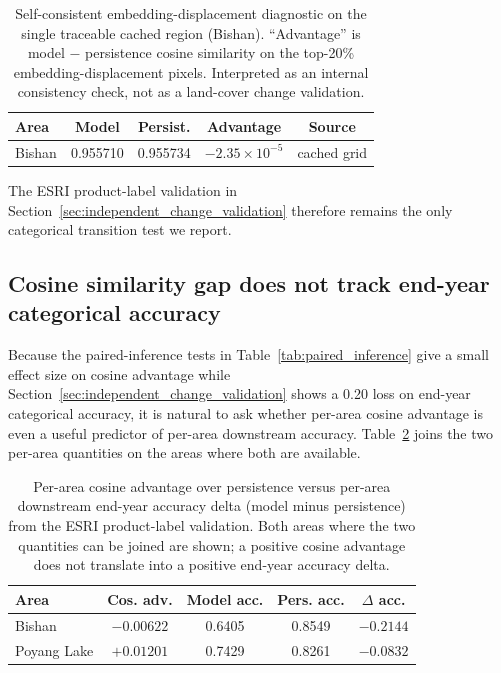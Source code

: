 \documentclass{article}
\begin{document}
\begin{table}[htbp]
\centering
\caption{Self-consistent embedding-displacement diagnostic on the single traceable cached region (Bishan). ``Advantage'' is model $-$ persistence cosine similarity on the top-20\% embedding-displacement pixels. Interpreted as an internal consistency check, not as a land-cover change validation.}
\label{tab:changepixel}
\begin{tabular}{lcccc}
\toprule
Area & Model & Persist. & Advantage & Source \\
\midrule
Bishan & 0.955710 & 0.955734 & $-2.35 \times 10^{-5}$ & cached grid \\
\bottomrule
\end{tabular}
\end{table}

The ESRI product-label validation in Section~\ref{sec:independent_change_validation} therefore remains the only categorical transition test we report.

\subsection{Cosine similarity gap does not track end-year categorical accuracy}
\label{sec:cosine_to_accuracy}

Because the paired-inference tests in Table~\ref{tab:paired_inference} give a small effect size on cosine advantage while Section~\ref{sec:independent_change_validation} shows a 0.20 loss on end-year categorical accuracy, it is natural to ask whether per-area cosine advantage is even a useful predictor of per-area downstream accuracy. Table~\ref{tab:cosine_to_accuracy} joins the two per-area quantities on the areas where both are available.

\begin{table}[htbp]
\centering
\caption{Per-area cosine advantage over persistence versus per-area downstream end-year accuracy delta (model minus persistence) from the ESRI product-label validation. Both areas where the two quantities can be joined are shown; a positive cosine advantage does not translate into a positive end-year accuracy delta.}
\label{tab:cosine_to_accuracy}
\footnotesize
\begin{tabular*}{\textwidth}{@{\extracolsep{\fill}}lcccc@{}}
\toprule
Area & Cos. adv. & Model acc. & Pers. acc. & $\Delta$ acc. \\
\midrule
Bishan       & $-0.00622$ & 0.6405 & 0.8549 & $-0.2144$ \\
Poyang Lake  & $+0.01201$ & 0.7429 & 0.8261 & $-0.0832$ \\
\bottomrule
\end{tabular*}
\end{table}
\end{document}
